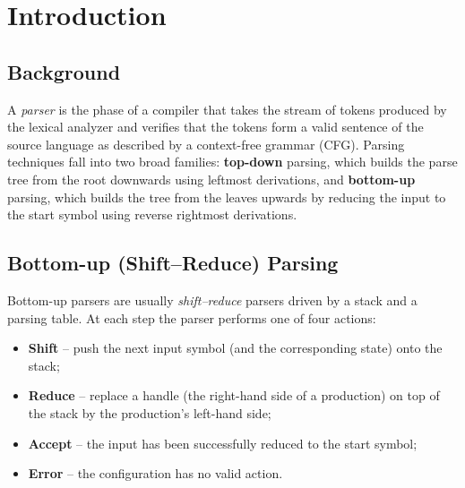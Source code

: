 \documentclass[11pt,a4paper]{report}
\begin{document}
\vfill

\clearpage
\tableofcontents

\clearpage
\listoffigures
\vspace{1.5cm}
\listoftables

\cleardoublepage
{}

\chapter{Introduction}

\section{Background}
A \emph{parser} is the phase of a compiler that takes the stream of tokens
produced by the lexical analyzer and verifies that the tokens form a valid
sentence of the source language as described by a context-free grammar (CFG).
Parsing techniques fall into two broad families: \textbf{top-down} parsing,
which builds the parse tree from the root downwards using leftmost derivations,
and \textbf{bottom-up} parsing, which builds the tree from the leaves upwards by
reducing the input to the start symbol using reverse rightmost derivations.

\section{Bottom-up (Shift--Reduce) Parsing}
Bottom-up parsers are usually \emph{shift--reduce} parsers driven by a stack and
a parsing table. At each step the parser performs one of four actions:
\begin{itemize}
  \item \textbf{Shift} -- push the next input symbol (and the corresponding state) onto the stack;
  \item \textbf{Reduce} -- replace a handle (the right-hand side of a production) on top of the stack by the production's left-hand side;
  \item \textbf{Accept} -- the input has been successfully reduced to the start symbol;
  \item \textbf{Error} -- the configuration has no valid action.
\end{itemize}
\end{document}
